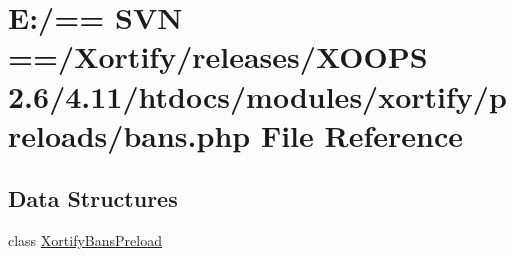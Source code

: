 \hypertarget{bans_8php}{\section{E\-:/== S\-V\-N ==/\-Xortify/releases/\-X\-O\-O\-P\-S 2.6/4.11/htdocs/modules/xortify/preloads/bans.php File Reference}
\label{bans_8php}
}
\subsection*{Data Structures}
\begin{DoxyCompactItemize}
\item 
class \hyperlink{class_xortify_bans_preload}{Xortify\-Bans\-Preload}
\end{DoxyCompactItemize}
